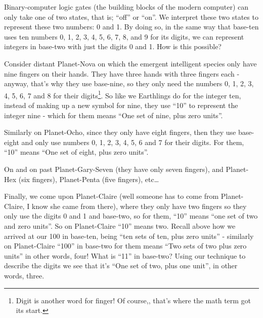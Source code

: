 \documentclass{article}
\begin{document}
Binary-computer logic gates (the building blocks of the modern computer)
can only take one of two states, that is; ``off'' or ``on''.
We interpret these two states to represent these two numbers: 0 and 1.
By doing so, in the same way that base-ten uses ten numbers 0,
1, 2, 3, 4, 5, 6, 7, 8, and 9 for its digits, we can represent integers
in base-two with just the digits 0 and 1. How is this possible?

Consider distant Planet-Nova on which the emergent
intelligent species only have nine fingers on their hands.
They have three hands with three fingers each - anyway,
that's why they use base-nine, so they only need the numbers 0,
1, 2, 3, 4, 5, 6, 7 and 8 for their digits\footnote{Digit
is another word for finger! Of course,, that's where the math term got its start.}.
So like we Earthlings do for the integer ten,
instead of making up a new symbol for nine,
they use ``10'' to represent the integer nine - which
for them means ``One set of nine, plus zero units''.

Similarly on Planet-Ocho, since they only have eight fingers,
then they use base-eight and only use numbers 0, 1,
2, 3, 4, 5, 6 and 7 for their digits. For them, ``10''
means ``One set of eight, plus zero units''.

On and on past Planet-Gary-Seven (they have only seven fingers),
and Planet-Hex (six fingers), Planet-Penta (five fingers), etc\dots{}

Finally, we come upon Planet-Claire (well someone
has to come from Planet-Claire,
I know she came from there),
where they only have two fingers
so they only use the digits 0 and 1 and base-two,
so for them, ``10'' means ``one set of two and zero units''.
So on Planet-Claire ``10'' means two.
Recall above how we arrived at our 100 in base-ten,
being ``ten sets of ten,
plus zero units'' - similarly on Planet-Claire ``100''
in base-two for them means ``Two sets of two plus zero units'' in other words,
four! What is ``11'' in base-two? Using our technique to
describe the digits we see that it's ``One set of two, plus one unit'',
in other words, three.
\end{document}
